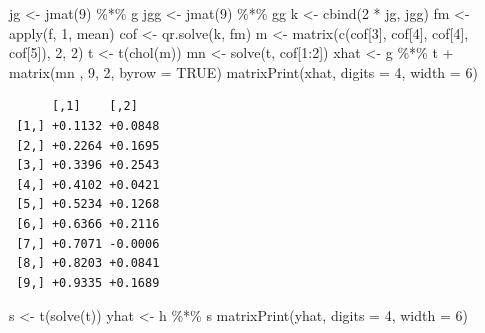 \documentclass[
  12pt,
  letterpaper,
  DIV=11,
  numbers=noendperiod]{scrartcl}
\newenvironment{Shaded}{\begin{snugshade}}{\end{snugshade}}
\newcommand{\AttributeTok}[1]{\textcolor[rgb]{0.40,0.45,0.13}{#1}}
\newcommand{\ConstantTok}[1]{\textcolor[rgb]{0.56,0.35,0.01}{#1}}
\newcommand{\DecValTok}[1]{\textcolor[rgb]{0.68,0.00,0.00}{#1}}
\newcommand{\FunctionTok}[1]{\textcolor[rgb]{0.28,0.35,0.67}{#1}}
\newcommand{\NormalTok}[1]{\textcolor[rgb]{0.00,0.23,0.31}{#1}}
\newcommand{\OtherTok}[1]{\textcolor[rgb]{0.00,0.23,0.31}{#1}}
\newcommand{\SpecialCharTok}[1]{\textcolor[rgb]{0.37,0.37,0.37}{#1}}
\begin{document}
\begin{Shaded}
\begin{Highlighting}[]
\NormalTok{jg }\OtherTok{\textless{}{-}} \FunctionTok{jmat}\NormalTok{(}\DecValTok{9}\NormalTok{) }\SpecialCharTok{\%*\%}\NormalTok{ g}
\NormalTok{jgg }\OtherTok{\textless{}{-}} \FunctionTok{jmat}\NormalTok{(}\DecValTok{9}\NormalTok{) }\SpecialCharTok{\%*\%}\NormalTok{ gg}
\NormalTok{k }\OtherTok{\textless{}{-}} \FunctionTok{cbind}\NormalTok{(}\DecValTok{2} \SpecialCharTok{*}\NormalTok{ jg, jgg)}
\NormalTok{fm }\OtherTok{\textless{}{-}} \FunctionTok{apply}\NormalTok{(f, }\DecValTok{1}\NormalTok{, mean)}
\NormalTok{cof }\OtherTok{\textless{}{-}} \FunctionTok{qr.solve}\NormalTok{(k, fm)}
\NormalTok{m }\OtherTok{\textless{}{-}} \FunctionTok{matrix}\NormalTok{(}\FunctionTok{c}\NormalTok{(cof[}\DecValTok{3}\NormalTok{], cof[}\DecValTok{4}\NormalTok{], cof[}\DecValTok{4}\NormalTok{], cof[}\DecValTok{5}\NormalTok{]), }\DecValTok{2}\NormalTok{, }\DecValTok{2}\NormalTok{)}
\NormalTok{t }\OtherTok{\textless{}{-}} \FunctionTok{t}\NormalTok{(}\FunctionTok{chol}\NormalTok{(m))}
\NormalTok{mn }\OtherTok{\textless{}{-}} \FunctionTok{solve}\NormalTok{(t, cof[}\DecValTok{1}\SpecialCharTok{:}\DecValTok{2}\NormalTok{])}
\NormalTok{xhat }\OtherTok{\textless{}{-}}\NormalTok{ g }\SpecialCharTok{\%*\%}\NormalTok{ t }\SpecialCharTok{+} \FunctionTok{matrix}\NormalTok{(mn , }\DecValTok{9}\NormalTok{, }\DecValTok{2}\NormalTok{, }\AttributeTok{byrow =} \ConstantTok{TRUE}\NormalTok{)}
\FunctionTok{matrixPrint}\NormalTok{(xhat, }\AttributeTok{digits =} \DecValTok{4}\NormalTok{, }\AttributeTok{width =} \DecValTok{6}\NormalTok{)}
\end{Highlighting}
\end{Shaded}

\begin{verbatim}
      [,1]    [,2]   
 [1,] +0.1132 +0.0848
 [2,] +0.2264 +0.1695
 [3,] +0.3396 +0.2543
 [4,] +0.4102 +0.0421
 [5,] +0.5234 +0.1268
 [6,] +0.6366 +0.2116
 [7,] +0.7071 -0.0006
 [8,] +0.8203 +0.0841
 [9,] +0.9335 +0.1689
\end{verbatim}

\begin{Shaded}
\begin{Highlighting}[]
\NormalTok{s }\OtherTok{\textless{}{-}} \FunctionTok{t}\NormalTok{(}\FunctionTok{solve}\NormalTok{(t))}
\NormalTok{yhat }\OtherTok{\textless{}{-}}\NormalTok{ h }\SpecialCharTok{\%*\%}\NormalTok{ s}
\FunctionTok{matrixPrint}\NormalTok{(yhat, }\AttributeTok{digits =} \DecValTok{4}\NormalTok{, }\AttributeTok{width =} \DecValTok{6}\NormalTok{)}
\end{Highlighting}
\end{Shaded}
\end{document}
